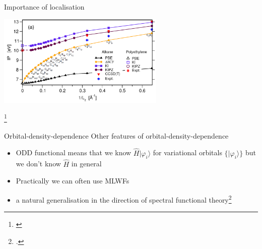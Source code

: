 \documentclass[xcolor=table,aspectratio=169]{beamer}
\newcommand\blfootcite[1]{%
  \begingroup
  \renewcommand\thefootnote{}\footnote{\hspace{-4ex}\cite{#1}}%
  \addtocounter{footnote}{-1}%
  \endgroup
}
\newcommand{\ket}[1]{|#1\rangle}
\numberwithin{equation}{section}
\begin{document}
\begin{frame}{Importance of localisation}
   \begin{center}
      \includegraphics[width=0.6\textwidth]{figures/nguyen_bulk_limit.png}
   \end{center}
   \blfootcite{Nguyen2018}

   \vspace{-2ex}



\end{frame}

\begin{frame}{Orbital-density-dependence}
   Other features of orbital-density-dependence
   \begin{itemize}[<+->]
      \item ODD functional means that we know $\hat H \ket{\varphi_i}$ for variational orbitals $\{\ket{\varphi_i}\}$ but we don't know $\hat H$ in general
      \item Practically we can often use MLWFs
      \item a natural generalisation in the direction of spectral functional theory\footcite{Ferretti2014}
   \end{itemize}

\end{frame}
\end{document}
